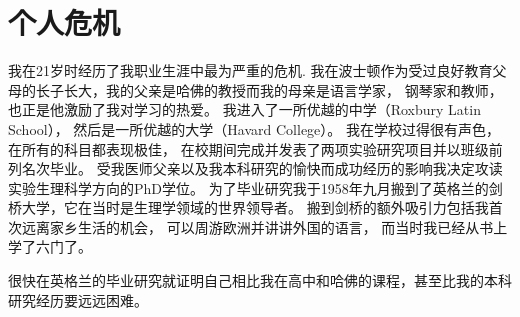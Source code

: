 \chapter{个人危机}
我在21岁时经历了我职业生涯中最为严重的危机. 我在波士顿作为受过良好教育父母的长子长大，我的父亲是哈佛的教授而我的母亲是语言学家， 钢琴家和教师， 也正是他激励了我对学习的热爱。 我进入了一所优越的中学（Roxbury Latin School）， 然后是一所优越的大学（Havard College）。 我在学校过得很有声色，在所有的科目都表现极佳， 在校期间完成并发表了两项实验研究项目并以班级前列名次毕业。 受我医师父亲以及我本科研究的愉快而成功经历的影响我决定攻读实验生理科学方向的PhD学位。 为了毕业研究我于1958年九月搬到了英格兰的剑桥大学，它在当时是生理学领域的世界领导者。 搬到剑桥的额外吸引力包括我首次远离家乡生活的机会， 可以周游欧洲并讲讲外国的语言， 而当时我已经从书上学了六门了。

很快在英格兰的毕业研究就证明自己相比我在高中和哈佛的课程，甚至比我的本科研究经历要远远困难。